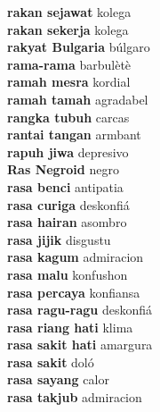 \textbf{ rakan sejawat  } kolega \\
\textbf{ rakan sekerja  } kolega \\
\textbf{ rakyat Bulgaria  } búlgaro \\
\textbf{ rama-rama  } barbulètè \\
\textbf{ ramah mesra  } kordial \\
\textbf{ ramah tamah  } agradabel \\
\textbf{ rangka tubuh  } carcas \\
\textbf{ rantai tangan  } armbant \\
\textbf{ rapuh jiwa  } depresivo \\
\textbf{ Ras Negroid  } negro \\
\textbf{ rasa benci  } antipatia \\
\textbf{ rasa curiga  } deskonfiá \\
\textbf{ rasa hairan  } asombro \\
\textbf{ rasa jijik  } disgustu \\
\textbf{ rasa kagum  } admiracion \\
\textbf{ rasa malu  } konfushon \\
\textbf{ rasa percaya  } konfiansa \\
\textbf{ rasa ragu-ragu  } deskonfiá \\
\textbf{ rasa riang hati  } klima \\
\textbf{ rasa sakit hati  } amargura \\
\textbf{ rasa sakit  } doló \\
\textbf{ rasa sayang  } calor \\
\textbf{ rasa takjub  } admiracion \\
